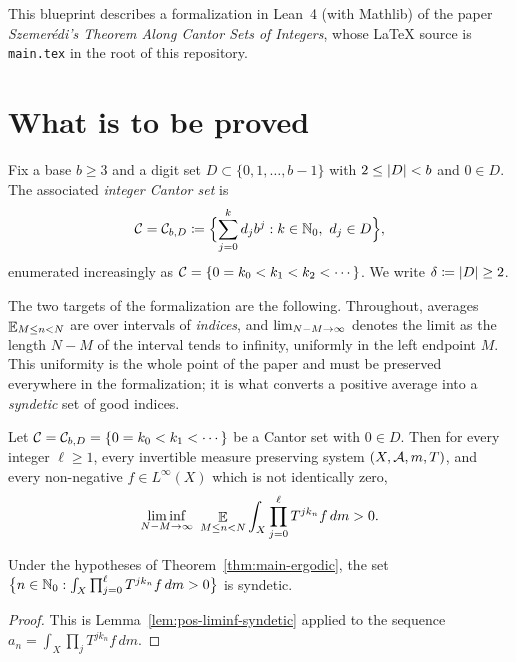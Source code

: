 This blueprint describes a formalization in Lean~4 (with Mathlib) of the paper
\emph{Szemer\'edi's Theorem Along Cantor Sets of Integers}, whose \LaTeX{} source is
\texttt{main.tex} in the root of this repository.

\section{What is to be proved}

Fix a base $b \geq 3$ and a digit set $D \subset \{0,1,\dots,b-1\}$ with $2 \leq \lvert D \rvert < b$
and $0 \in D$.  The associated \emph{integer Cantor set} is
\[
  \mathcal{C} = \mathcal{C}_{b,D} \coloneqq \Bigl\{ \sum_{j=0}^{k} d_j b^j : k \in \mathbb{N}_0,\ d_j \in D \Bigr\},
\]
enumerated increasingly as $\mathcal{C} = \{0 = k_0 < k_1 < k_2 < \cdots\}$.  We write
$\delta \coloneqq \lvert D \rvert \geq 2$.

The two targets of the formalization are the following.  Throughout, averages
$\mathop{\mathbb{E}}_{M \leq n < N}$ are over intervals of \emph{indices}, and $\lim_{N-M \to \infty}$ denotes the limit as
the length $N - M$ of the interval tends to infinity, uniformly in the left endpoint $M$.
This uniformity is the whole point of the paper and must be preserved everywhere in the
formalization; it is what converts a positive average into a \emph{syndetic} set of good indices.

\begin{theorem}
  \label{thm:main-ergodic}
  \leanok
  Let $\mathcal{C} = \mathcal{C}_{b,D} = \{0 = k_0 < k_1 < \cdots\}$ be a Cantor set with $0 \in D$.
  Then for every integer $\ell \geq 1$, every invertible measure preserving system
  $(X,\mathcal{A},m,T)$, and every non-negative $f \in L^{\infty}(X)$ which is not identically zero,
  \[
    \liminf_{N-M \to \infty} \ \mathop{\mathbb{E}}_{M \leq n < N} \int_X \prod_{j=0}^{\ell} T^{j k_n} f \, dm > 0 .
  \]
\end{theorem}

\begin{corollary}
  \label{cor:syndetic}
  \leanok
  Under the hypotheses of Theorem~\ref{thm:main-ergodic}, the set
  $\bigl\{ n \in \mathbb{N}_0 : \int_X \prod_{j=0}^{\ell} T^{j k_n} f \, dm > 0 \bigr\}$ is syndetic.
\end{corollary}

\begin{proof}
  This is Lemma~\ref{lem:pos-liminf-syndetic} applied to the sequence
  $a_n = \int_X \prod_{j} T^{j k_n} f \, dm$.
\end{proof}

